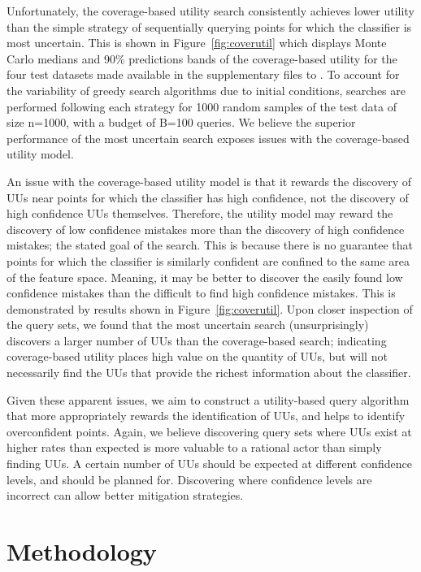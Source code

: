 \documentclass[letterpaper]{article} %
\begin{document}
Unfortunately, the coverage-based utility search consistently achieves lower utility than the simple strategy of sequentially querying points for which the classifier is most uncertain.  This is shown in Figure~\ref{fig:coverutil} which displays Monte Carlo medians and 90\% predictions bands of the coverage-based utility for the four test datasets made available in the supplementary files to \citet{Bansal2018}.  To account for the variability of greedy search algorithms due to initial conditions, searches are performed following each strategy for 1000 random samples of the test data of size n=1000, with a budget of B=100 queries.  We believe the superior performance of the most uncertain search exposes issues with the coverage-based utility model.  

An issue with the coverage-based utility model is that it rewards the discovery of UUs near points for which the classifier has high confidence, not the discovery of high confidence UUs themselves.  Therefore, the utility model may reward the discovery of low confidence mistakes more than the discovery of high confidence mistakes; the stated goal of the search. This is because there is no guarantee that points for which the classifier is similarly confident are confined to the same area of the feature space.  Meaning, it may be better to discover the easily found low confidence mistakes than the difficult to find high confidence mistakes. This is demonstrated by results shown in Figure~\ref{fig:coverutil}.  Upon closer inspection of the query sets, we found that the most uncertain search (unsurprisingly) discovers a larger number of UUs than the coverage-based search; indicating coverage-based utility places high value on the quantity of UUs, but will not necessarily find the UUs that provide the richest information about the classifier.

Given these apparent issues, we aim to construct a utility-based query algorithm that more appropriately rewards the identification of UUs, and helps to identify overconfident points. Again, we believe discovering query sets where UUs exist at higher rates than expected is more valuable to a rational actor than simply finding UUs.  A certain number of UUs should be expected at different confidence levels, and should be planned for.  Discovering where confidence levels are incorrect can allow better mitigation strategies. 

\section{Methodology}
\end{document}
